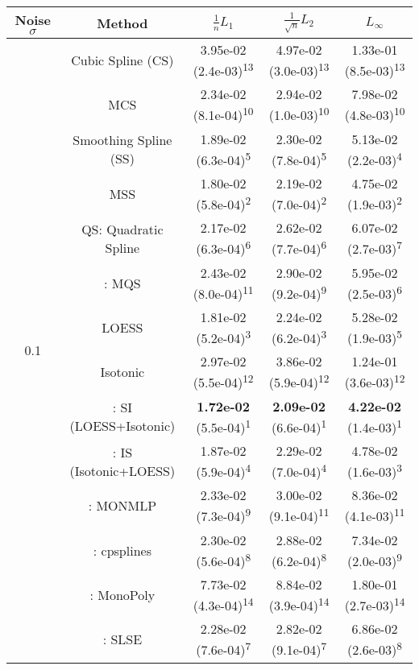 \begin{tabular}{ccccc}
\toprule
Noise $\sigma$ & Method&$\frac 1n L_1$&$\frac{1}{\sqrt n}L_2$&$L_\infty$\tabularnewline
\midrule
\multirow{14}{*}{0.1}&Cubic Spline (CS)& 3.95e-02 (2.4e-03)\textsuperscript{13}& 4.97e-02 (3.0e-03)\textsuperscript{13}& 1.33e-01 (8.5e-03)\textsuperscript{13}\tabularnewline
&MCS& 2.34e-02 (8.1e-04)\textsuperscript{10}& 2.94e-02 (1.0e-03)\textsuperscript{10}& 7.98e-02 (4.8e-03)\textsuperscript{10}\tabularnewline
&Smoothing Spline (SS)& 1.89e-02 (6.3e-04)\textsuperscript{5}& 2.30e-02 (7.8e-04)\textsuperscript{5}& 5.13e-02 (2.2e-03)\textsuperscript{4}\tabularnewline
&MSS& 1.80e-02 (5.8e-04)\textsuperscript{2}& 2.19e-02 (7.0e-04)\textsuperscript{2}& 4.75e-02 (1.9e-03)\textsuperscript{2}\tabularnewline
&QS: Quadratic Spline& 2.17e-02 (6.3e-04)\textsuperscript{6}& 2.62e-02 (7.7e-04)\textsuperscript{6}& 6.07e-02 (2.7e-03)\textsuperscript{7}\tabularnewline
&\textcite{heMonotoneBsplineSmoothing1998}: MQS& 2.43e-02 (8.0e-04)\textsuperscript{11}& 2.90e-02 (9.2e-04)\textsuperscript{9}& 5.95e-02 (2.5e-03)\textsuperscript{6}\tabularnewline
&LOESS& 1.81e-02 (5.2e-04)\textsuperscript{3}& 2.24e-02 (6.2e-04)\textsuperscript{3}& 5.28e-02 (1.9e-03)\textsuperscript{5}\tabularnewline
&Isotonic& 2.97e-02 (5.5e-04)\textsuperscript{12}& 3.86e-02 (5.9e-04)\textsuperscript{12}& 1.24e-01 (3.6e-03)\textsuperscript{12}\tabularnewline
&\textcite{mammenEstimatingSmoothMonotone1991}: SI (LOESS+Isotonic)& \textbf{1.72e-02} (5.5e-04)\textsuperscript{1}& \textbf{2.09e-02} (6.6e-04)\textsuperscript{1}& \textbf{4.22e-02} (1.4e-03)\textsuperscript{1}\tabularnewline
&\textcite{mammenEstimatingSmoothMonotone1991}: IS (Isotonic+LOESS)& 1.87e-02 (5.9e-04)\textsuperscript{4}& 2.29e-02 (7.0e-04)\textsuperscript{4}& 4.78e-02 (1.6e-03)\textsuperscript{3}\tabularnewline
&\textcite{cannonMonmlpMultilayerPerceptron2017}: MONMLP& 2.33e-02 (7.3e-04)\textsuperscript{9}& 3.00e-02 (9.1e-04)\textsuperscript{11}& 8.36e-02 (4.1e-03)\textsuperscript{11}\tabularnewline
&\textcite{navarro-garciaConstrainedSmoothingOutofrange2023}: cpsplines& 2.30e-02 (5.6e-04)\textsuperscript{8}& 2.88e-02 (6.2e-04)\textsuperscript{8}& 7.34e-02 (2.0e-03)\textsuperscript{9}\tabularnewline
&\textcite{murrayFastFlexibleMethods2016a}: MonoPoly& 7.73e-02 (4.3e-04)\textsuperscript{14}& 8.84e-02 (3.9e-04)\textsuperscript{14}& 1.80e-01 (2.7e-03)\textsuperscript{14}\tabularnewline
&\textcite{groeneboomConfidenceIntervalsMonotone2023}: SLSE& 2.28e-02 (7.6e-04)\textsuperscript{7}& 2.82e-02 (9.1e-04)\textsuperscript{7}& 6.86e-02 (2.6e-03)\textsuperscript{8}\tabularnewline
\midrule

\end{tabular}
